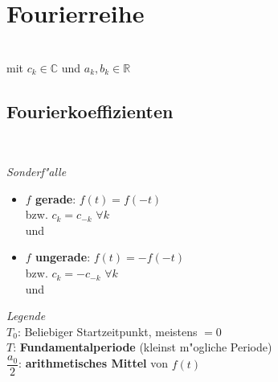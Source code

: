 \section{Fourierreihe}
\\
mit \( c_k \in \mathbb{C} \) und \( a_k, b_k \in \mathbb{R} \)

\subsection{Fourierkoeffizienten}

\begin{minipage}{0.48\linewidth}




\\
\end{minipage}
\hfill
\begin{minipage}{0.5\linewidth}
\emph{Sonderf"alle}
\begin{itemize}
\item	\textbf{\(f\) gerade}: \( f(t) = f(-t) \)\\
 bzw. \(c_k = c_{-k}\) \(\forall k\)\\
\hspace*{2.5cm} und 


\item	\textbf{\(f\) ungerade}: \(f(t) = -f(-t)\)\\
 bzw. \(c_k = -c_{-k}\) \(\forall k\)\\
\hspace*{2.5cm} und 
\end{itemize}
\end{minipage}
\newpage
\emph{Legende}\\
\(T_0\): Beliebiger Startzeitpunkt, meistens \(=0\)\\
\(T\): \textbf{Fundamentalperiode} (kleinst m"ogliche Periode)\\
\(\dfrac{a_0}{2}\): \textbf{arithmetisches Mittel} von \(f(t)\)\\


